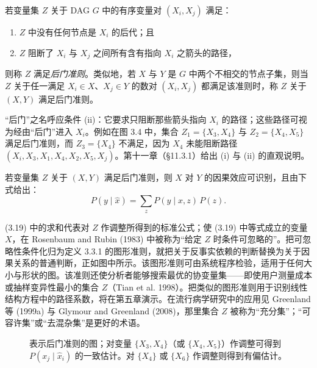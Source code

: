\begin{definition}[后门]
若变量集 $Z$ 关于 DAG $G$ 中的有序变量对 $(X_i,X_j)$ 满足：
\begin{enumerate}[label=(\roman*),leftmargin=2.2em]
\item $Z$ 中没有任何节点是 $X_i$ 的后代；且
\item $Z$ 阻断了 $X_i$ 与 $X_j$ 之间所有含有指向 $X_i$ 之箭头的路径，
\end{enumerate}
则称 $Z$ 满足\emph{后门准则}。类似地，若 $X$ 与 $Y$ 是 $G$ 中两个不相交的节点子集，则当 $Z$ 关于任一满足 $X_i\in X$、$X_j\in Y$ 的数对 $(X_i,X_j)$ 都满足该准则时，称 $Z$ 关于 $(X,Y)$ 满足后门准则。
\end{definition}

“后门”之名呼应条件 (ii)：它要求只阻断那些箭头指向 $X_i$ 的路径；这些路径可视为经由“后门”进入 $X_i$。例如在图 3.4 中，集合 $Z_1=\{X_3,X_4\}$ 与 $Z_2=\{X_4,X_5\}$ 满足后门准则，而 $Z_3=\{X_4\}$ 不满足，因为 $X_4$ 未能阻断路径 $(X_i,X_3,X_1,X_4,X_2,X_5,X_j)$。第十一章（\S 11.3.1）给出 (i) 与 (ii) 的直观说明。

\begin{theorem}[后门调整]
若变量集 $Z$ 关于 $(X,Y)$ 满足后门准则，则 $X$ 对 $Y$ 的因果效应可识别，且由下式给出：
\begin{equation}
P(y\mid\hat{x}) = \sum_{z} P(y\mid x,z)\,P(z). \tag{3.19}
\end{equation}
\end{theorem}

\textup{(3.19)} 中的求和代表对 $Z$ 作调整所得到的标准公式；使 \textup{(3.19)} 中等式成立的变量 $X$，在 Rosenbaum and Rubin (1983) 中被称为“给定 $Z$ 时条件可忽略的”。把可忽略性条件化归为定义 3.3.1 的图形准则，就把关于反事实依赖的判断替换为关于因果关系的普通判断，正如图中所示。该图形准则可由系统程序检验，适用于任何大小与形状的图。该准则还使分析者能够搜索最优的协变量集——即使用户测量成本或抽样变异性最小的集合 $Z$（Tian et al. 1998）。把类似的图形准则用于识别线性结构方程中的路径系数，将在第五章演示。在流行病学研究中的应用见 Greenland 等 (1999a) 与 Glymour and Greenland (2008)，那里集合 $Z$ 被称为“充分集”；“可容许集”或“去混杂集”是更好的术语。

\begin{figure}[htbp]
\centering
{}
\caption{表示后门准则的图；对变量 $\{X_3,X_4\}$（或 $\{X_4,X_5\}$）作调整可得到 $P(x_j\mid\hat{x}_i)$ 的一致估计。对 $\{X_4\}$ 或 $\{X_6\}$ 作调整则得到有偏估计。}
\label{fig:3.4}
\end{figure}

